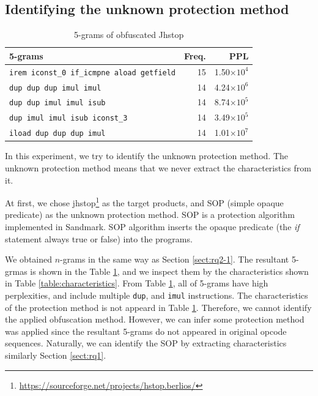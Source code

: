 \documentclass[conference]{IEEEtran}
\begin{document}
\subsection{Identifying the unknown protection method}

\begin{table}[t]
  \centering
  \footnotesize{
    \caption{5-grams of obfuscated Jhstop}\label{table:jhstop}
  \begin{tabular}{l|r|r}
    \textbf{5-grams} & \textbf{Freq.} & \textbf{PPL}\\ \hline
    \texttt{irem iconst\_0 if\_icmpne aload getfield} & 15 & 1.50$\times10^4$ \\
    \texttt{dup dup dup imul imul}                    & 14 & 4.24$\times10^6$ \\
    \texttt{dup dup imul imul isub}                   & 14 & 8.74$\times10^5$ \\
    \texttt{dup imul imul isub iconst\_3}             & 14 & 3.49$\times10^5$ \\
    \texttt{iload dup dup dup imul}                   & 14 & 1.01$\times10^7$ \\
    \end{tabular}}
\end{table}

In this experiment, we try to identify the unknown protection method.
The unknown protection method means that we never extract the
characteristics from it.

At first, we chose
jhstop\footnote[6]{\url{https://sourceforge.net/projects/hstop.berlios/}}
as the target products, and SOP (simple opaque predicate) as the
unknown protection method.  SOP is a protection algorithm implemented
in Sandmark.  SOP algorithm inserts the opaque predicate (the
\emph{if} statement always true or false) into the programs.

We obtained $n$-grams in the same way as Section \ref{sect:rq2-1}. The
resultant 5-grmas is shown in the Table \ref{table:jhstop}, and we
inspect them by the characteristics shown in Table
\ref{table:characteristics}.  From Table \ref{table:jhstop}, all of
5-grams have high perplexities, and include multiple \texttt{dup}, and
\texttt{imul} instructions.  The characteristics of the protection
method is not appeard in Table \ref{table:jhstop}.  Therefore, we
cannot identify the applied obfuscation method.
%
However, we can infer some protection method was applied since the
resultant 5-grams do not appeared in original opcode sequences.
%
Naturally, we can identify the SOP by extracting characteristics
similarly Section \ref{sect:rq1}.
\end{document}
